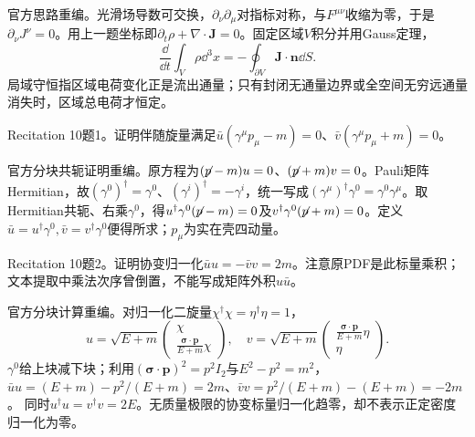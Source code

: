 \begin{solution}
官方思路重编。光滑场导数可交换，$\partial_\nu\partial_\mu$对指标对称，与$F^{\mu\nu}$收缩为零，于是$\partial_\nu J^\nu=0$。用上一题坐标即$\partial_t\rho+\nabla\cdot\mathbf J=0$。固定区域$V$积分并用Gauss定理，
\begin{equation}\frac{\dd}{\dd t}\int_V\rho\dd^3x=-\oint_{\partial V}\mathbf J\cdot\mathbf n\dd S.\end{equation}
局域守恒指区域电荷变化正是流出通量；只有封闭无通量边界或全空间无穷远通量消失时，区域总电荷才恒定。
\end{solution}
\begin{exercise}\label{ex:rec-10-1}
Recitation 10题1。证明伴随旋量满足$\bar u(\gamma^\mu p_\mu-m)=0$、$\bar v(\gamma^\mu p_\mu+m)=0$。
\end{exercise}
\begin{solution}
官方分块共轭证明重编。原方程为$(\slashed p-m)u=0$、$(\slashed p+m)v=0$。Pauli矩阵Hermitian，故$(\gamma^0)^\dagger=\gamma^0$、$(\gamma^i)^\dagger=-\gamma^i$，统一写成$(\gamma^\mu)^\dagger\gamma^0=\gamma^0\gamma^\mu$。取Hermitian共轭、右乘$\gamma^0$，得$u^\dagger\gamma^0(\slashed p-m)=0$及$v^\dagger\gamma^0(\slashed p+m)=0$。定义$\bar u=u^\dagger\gamma^0,\bar v=v^\dagger\gamma^0$便得所求；$p_\mu$为实在壳四动量。
\end{solution}
\begin{exercise}\label{ex:rec-10-2}
Recitation 10题2。证明协变归一化$\bar u u=-\bar v v=2m$。注意原PDF是此标量乘积；文本提取中乘法次序曾倒置，不能写成矩阵外积$u\bar u$。
\end{exercise}
\begin{solution}
官方分块计算重编。对归一化二旋量$\chi^\dagger\chi=\eta^\dagger\eta=1$，
\begin{equation}
 u=\sqrt{E+m}\begin{pmatrix}\chi\\\frac{\boldsymbol\sigma\cdot\mathbf p}{E+m}\chi\end{pmatrix},\quad
 v=\sqrt{E+m}\begin{pmatrix}\frac{\boldsymbol\sigma\cdot\mathbf p}{E+m}\eta\\\eta\end{pmatrix}.
\end{equation}
$\gamma^0$给上块减下块；利用$(\boldsymbol\sigma\cdot\mathbf p)^2=p^2I_2$与$E^2-p^2=m^2$，
$\bar u u=(E+m)-p^2/(E+m)=2m$、$\bar v v=p^2/(E+m)-(E+m)=-2m$。
同时$u^\dagger u=v^\dagger v=2E$。无质量极限的协变标量归一化趋零，却不表示正定密度归一化为零。
\end{solution}
